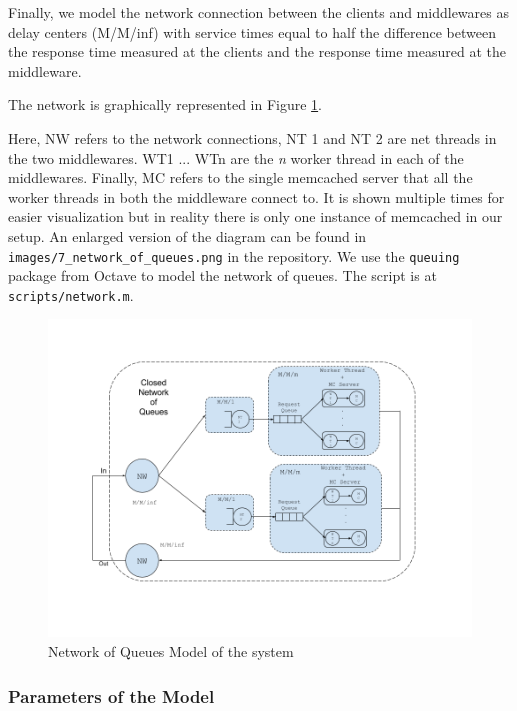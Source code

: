 \documentclass[11pt,a4paper]{article}
\begin{document}
Finally, we model the network connection between the clients and middlewares as delay centers (M/M/inf) with service times equal to half the difference between the response time measured at the clients and the response time measured at the middleware. 

The network is graphically represented in Figure \ref{fig:32_network_of_queues}. 

Here, NW refers to the network connections, NT 1 and NT 2 are net threads in the two middlewares. WT1 ... WTn are the \textit{n} worker thread in each of the middlewares. Finally, MC refers to the single memcached server that all the worker threads in both the middleware connect to. It is shown multiple times for easier visualization but in reality there is only one instance of memcached in our setup. An enlarged version of the diagram can be found in \texttt{images/7\_network\_of\_queues.png} in the repository. We use the \texttt{queuing} package from Octave to model the network of queues. The script is at \texttt{scripts/network.m}.

\begin{figure}[H]
\includegraphics[scale=0.5]{images/7_network_of_queues}
\caption{Network of Queues Model of the system}
\label{fig:32_network_of_queues}
\end{figure}

\subsubsection{Parameters of the Model}


\pagebreak
\appendix
\end{document}
